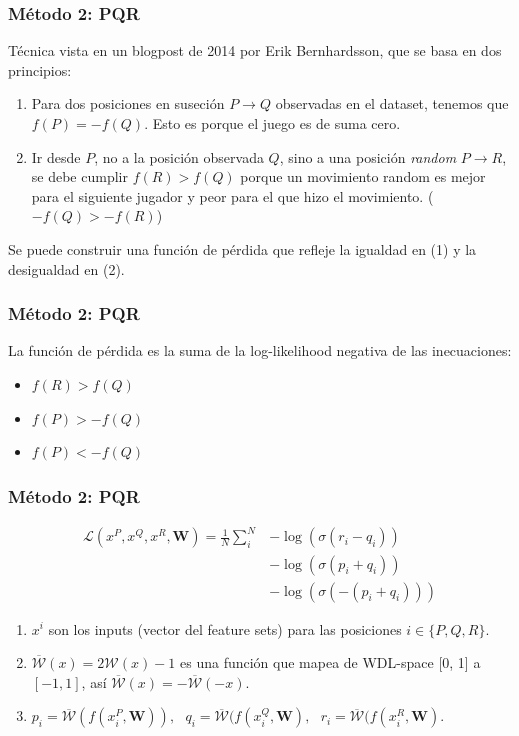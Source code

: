 \begin{frame}
\frametitle{Método 2: PQR}
Técnica vista en un blogpost de 2014 por Erik Bernhardsson, que se basa en dos principios: \pause \\
\begin{enumerate}
\item Para dos posiciones en suseción $P \rightarrow Q$ observadas en el dataset, tenemos que \mbox{$f(P)=-f(Q)$}. Esto es porque el juego es de suma cero. \pause
\item Ir desde $P$, no a la posición observada $Q$, sino a una posición \textit{random} $P \rightarrow R$, se debe cumplir $f(R) > f(Q)$ porque un movimiento random es mejor para el siguiente jugador y peor para el que hizo el movimiento. ($-f(Q) > -f(R)$)
\end{enumerate}
\pause
Se puede construir una función de pérdida que refleje la igualdad en (1) y la desigualdad en (2).
\end{frame}


\begin{frame}
\frametitle{Método 2: PQR}
La función de pérdida es la suma de la log-likelihood negativa de las inecuaciones:
\begin{itemize}
\item ${f(R) > f(Q)}$
\item ${f(P) > - f(Q)}$
\item ${f(P) < -f(Q)}$
\end{itemize}
\end{frame}

\begin{frame}
\frametitle{Método 2: PQR}
\begin{align*}
\mathcal{L}(x^P, x^Q, x^R, \bm{W})=
\frac{1}{N}
\sum_i^N
& -\log\left(\sigma(r_i - q_i)\right) \\
& -\log\left(\sigma(p_i + q_i)\right) \\
& -\log\left(\sigma(-(p_i + q_i))\right)
\end{align*}
\begin{enumerate}
\itemsep0em
\item $x^i$ son los inputs (vector del feature sets) para las posiciones $i \in \{P,Q,R\}$.
\item $\overline{\mathcal{W}}(x) = 2 \mathcal{W}(x) - 1$ es una función que mapea de WDL-space [0, 1] a $[-1, 1]$, así $\overline{\mathcal{W}}(x) = -\overline{\mathcal{W}}(-x)$.
\item $
p_i = \overline{\mathcal{W}}(f(x^P_i, \bm{W})),\text{ }
q_i = \overline{\mathcal{W}}(f(x^Q_i, \bm{W}),\text{ }
r_i = \overline{\mathcal{W}}(f(x^R_i, \bm{W})
$.
\end{enumerate}
\end{frame}


